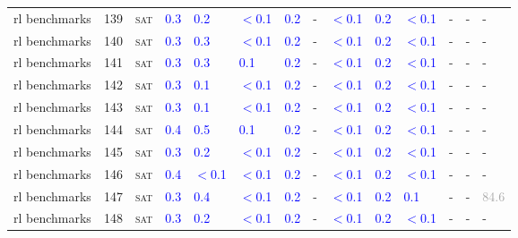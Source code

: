\begin{center}
{\begin{longtable}{@{}llllllllllllll@{}}
rl benchmarks & 139 & \textsc{sat} & \textcolor{blue}{0.3} & \textcolor{blue}{0.2} & \textcolor{blue}{$<$0.1} & \textcolor{blue}{0.2} & - & \textcolor{blue}{$<$0.1} & \textcolor{blue}{0.2} & \textcolor{blue}{$<$0.1} & - & - & - \\
rl benchmarks & 140 & \textsc{sat} & \textcolor{blue}{0.3} & \textcolor{blue}{0.3} & \textcolor{blue}{$<$0.1} & \textcolor{blue}{0.2} & - & \textcolor{blue}{$<$0.1} & \textcolor{blue}{0.2} & \textcolor{blue}{$<$0.1} & - & - & - \\
rl benchmarks & 141 & \textsc{sat} & \textcolor{blue}{0.3} & \textcolor{blue}{0.3} & \textcolor{blue}{0.1} & \textcolor{blue}{0.2} & - & \textcolor{blue}{$<$0.1} & \textcolor{blue}{0.2} & \textcolor{blue}{$<$0.1} & - & - & - \\
rl benchmarks & 142 & \textsc{sat} & \textcolor{blue}{0.3} & \textcolor{blue}{0.1} & \textcolor{blue}{$<$0.1} & \textcolor{blue}{0.2} & - & \textcolor{blue}{$<$0.1} & \textcolor{blue}{0.2} & \textcolor{blue}{$<$0.1} & - & - & - \\
rl benchmarks & 143 & \textsc{sat} & \textcolor{blue}{0.3} & \textcolor{blue}{0.1} & \textcolor{blue}{$<$0.1} & \textcolor{blue}{0.2} & - & \textcolor{blue}{$<$0.1} & \textcolor{blue}{0.2} & \textcolor{blue}{$<$0.1} & - & - & - \\
rl benchmarks & 144 & \textsc{sat} & \textcolor{blue}{0.4} & \textcolor{blue}{0.5} & \textcolor{blue}{0.1} & \textcolor{blue}{0.2} & - & \textcolor{blue}{$<$0.1} & \textcolor{blue}{0.2} & \textcolor{blue}{$<$0.1} & - & - & - \\
rl benchmarks & 145 & \textsc{sat} & \textcolor{blue}{0.3} & \textcolor{blue}{0.2} & \textcolor{blue}{$<$0.1} & \textcolor{blue}{0.2} & - & \textcolor{blue}{$<$0.1} & \textcolor{blue}{0.2} & \textcolor{blue}{$<$0.1} & - & - & - \\
rl benchmarks & 146 & \textsc{sat} & \textcolor{blue}{0.4} & \textcolor{blue}{$<$0.1} & \textcolor{blue}{$<$0.1} & \textcolor{blue}{0.2} & - & \textcolor{blue}{$<$0.1} & \textcolor{blue}{0.2} & \textcolor{blue}{$<$0.1} & - & - & - \\
rl benchmarks & 147 & \textsc{sat} & \textcolor{blue}{0.3} & \textcolor{blue}{0.4} & \textcolor{blue}{$<$0.1} & \textcolor{blue}{0.2} & - & \textcolor{blue}{$<$0.1} & \textcolor{blue}{0.2} & \textcolor{blue}{0.1} & - & - & \textcolor{darkgray}{84.6} \\
rl benchmarks & 148 & \textsc{sat} & \textcolor{blue}{0.3} & \textcolor{blue}{0.2} & \textcolor{blue}{$<$0.1} & \textcolor{blue}{0.2} & - & \textcolor{blue}{$<$0.1} & \textcolor{blue}{0.2} & \textcolor{blue}{$<$0.1} & - & - & - \\

\end{longtable}}
\end{center}
